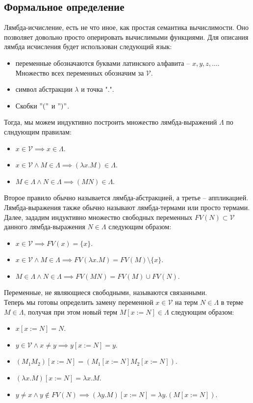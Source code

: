 \subsection{Формальное определение}
Лямбда-исчисление, есть не что иное, как простая семантика вычислимости. Оно позволяет довольно просто оперировать вычислимыми функциями.
Для описания лямбда исчисления будет использован следующий язык:
\begin{itemize}
  \item переменные обозначаются буквами латинского алфавита -- $x,y,z,\ldots$. Множество всех переменных обозначим за $\mathcal{V}$.
  \item символ абстракции $\lambda$ и точка "$.$".
  \item Скобки $"("$ и $")"$.
\end{itemize}
Тогда, мы можем индуктивно построить множество лямбда-выражений $\Lambda$ по слндующим правилам:
\begin{itemize}
  \item $x \in \mathcal{V} \implies x \in \Lambda$.
  \item $x \in \mathcal{V} \land M \in \Lambda \implies (\lambda x . M) \in \Lambda$.
  \item $M \in \Lambda \land N \in \Lambda \implies (M N) \in \Lambda$.
\end{itemize}
Второе правило обычно называется лямбда-абстракцией, а третье -- аппликацией.
Лямбда-выражения также обычно называют лямбда-термами или просто термами. \\
Далее, зададим индуктивно множество свободных переменных $FV(N) \subset \mathcal{V}$ данного лямбда-выражения $N \in \Lambda$
следующим образом:
\begin{itemize}
  \item $x \in \mathcal{V} \implies FV(x) = \{x\}$.
  \item $x \in \mathcal{V} \land M \in \Lambda \implies FV(\lambda x . M) = FV(M) \setminus \{x\}$.
  \item $M \in \Lambda \land N \in \Lambda \implies FV(M N) = FV(M) \cup FV(N)$.
\end{itemize}
Переменные, не являющиеся свободными, называются связанными. \\
Теперь мы готовы определить замену переменной $x \in \mathcal{V}$ на терм $N \in \Lambda$ в терме $M \in \Lambda$,
получая при этом новый терм $M[x := N] \in \Lambda$ следующим образом:
\begin{itemize}
  \item $x[x := N] = N$.
  \item $y \in \mathcal{V} \land x \neq y \implies y[x := N] = y$.
  \item $(M_1 M_2)[x := N] = (M_1[x := N] M_2[x := N])$.
  \item $(\lambda x . M)[x := N] = \lambda x . M$.
  \item $y \neq x \land y \not \in FV(N) \implies (\lambda y . M)[x := N] = \lambda y . (M[x := N])$.
\end{itemize}
